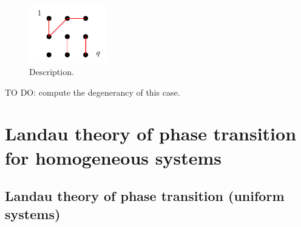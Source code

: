 \documentclass[../main/main.tex]{subfiles}
\begin{document}
  \begin{figure}[h!]
  \centering
  \includegraphics[width=0.3\textwidth]{../lessons/15_image/12.pdf}
  \caption{\label{fig:15_9} Description.}
  \end{figure}

  \begin{exercise}{}{}
  TO DO: compute the degenerancy of this case.
  \end{exercise}







\chapter{Landau theory of phase transition for homogeneous systems}

\section{Landau theory of phase transition (uniform systems)}
\end{document}
